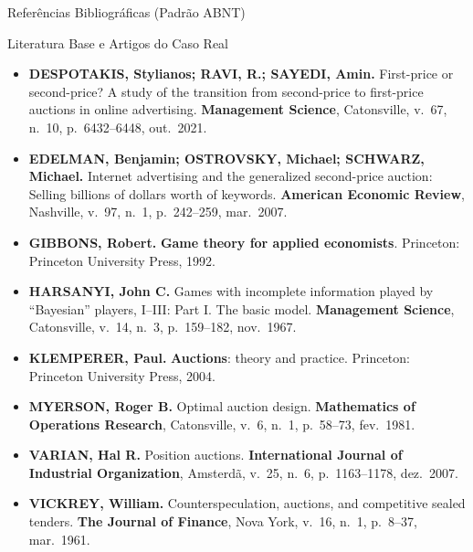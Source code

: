\documentclass[aspectratio=169, 10pt]{beamer}
\newcommand{\defbox}[2]{%
  \begin{block}{#1}
    \footnotesize\setlength{\abovedisplayskip}{4pt}\setlength{\belowdisplayskip}{4pt}
    #2\par
  \end{block}%
}
\begin{document}
\begin{frame}{Referências Bibliográficas (Padrão ABNT)}
  \defbox{Literatura Base e Artigos do Caso Real}{%
    \scriptsize
  \begin{itemize}\setlength{\itemsep}{4pt}
      \item \textbf{DESPOTAKIS, Stylianos; RAVI, R.; SAYEDI, Amin.}
        First-price or second-price? A study of the transition from
        second-price to first-price auctions in online advertising.
        \textbf{Management Science}, Catonsville, v.\ 67, n.\ 10,
        p.\ 6432--6448, out.\ 2021.
      \item \textbf{EDELMAN, Benjamin; OSTROVSKY, Michael; SCHWARZ,
        Michael.} Internet advertising and the generalized
        second-price auction: Selling billions of dollars worth of
        keywords. \textbf{American Economic Review}, Nashville,
        v.\ 97, n.\ 1, p.\ 242--259, mar.\ 2007.
      \item \textbf{GIBBONS, Robert.} \textbf{Game theory for applied
        economists}. Princeton: Princeton University Press, 1992.
      \item \textbf{HARSANYI, John C.} Games with incomplete
        information played by ``Bayesian'' players, I--III: Part I.
        The basic model. \textbf{Management Science}, Catonsville,
        v.\ 14, n.\ 3, p.\ 159--182, nov.\ 1967.
      \item \textbf{KLEMPERER, Paul.} \textbf{Auctions}: theory and
        practice. Princeton: Princeton University Press, 2004.
      \item \textbf{MYERSON, Roger B.} Optimal auction design.
        \textbf{Mathematics of Operations Research}, Catonsville,
        v.\ 6, n.\ 1, p.\ 58--73, fev.\ 1981.
      \item \textbf{VARIAN, Hal R.} Position auctions.
        \textbf{International Journal of Industrial Organization},
        Amsterdã, v.\ 25, n.\ 6, p.\ 1163--1178, dez.\ 2007.
      \item \textbf{VICKREY, William.} Counterspeculation, auctions,
        and competitive sealed tenders. \textbf{The Journal of
        Finance}, Nova York, v.\ 16, n.\ 1, p.\ 8--37, mar.\ 1961.
    \end{itemize}
  }
\end{frame}
\end{document}
